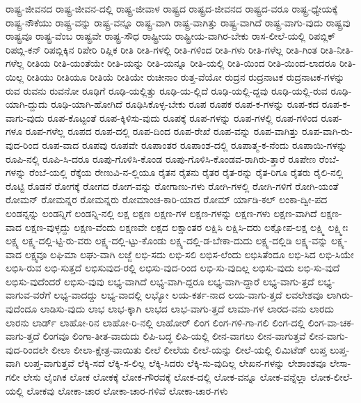 {ರಾಷ್ಟ್ರ-ಜೀವನದ
ರಾಷ್ಟ್ರ-ಜೀವನ-ದಲ್ಲಿ
ರಾಷ್ಟ್ರ-ಜೀವಾಳ
ರಾಷ್ಟ್ರದ
ರಾಷ್ಟ್ರದ-ಜೀವನದ
ರಾಷ್ಟ್ರದ-ವರೂ
ರಾಷ್ಟ್ರ-ಧ್ಯೇಯಕ್ಕೆ
ರಾಷ್ಟ್ರ-ನೌಕೆಯು
ರಾಷ್ಟ್ರ-ವನ್ನು
ರಾಷ್ಟ್ರ-ವನ್ನೂ
ರಾಷ್ಟ್ರ-ವಾಗಿ
ರಾಷ್ಟ್ರ-ವಾಗಿತ್ತು
ರಾಷ್ಟ್ರ-ವಾಗಿದೆ
ರಾಷ್ಟ್ರ-ವಾಗು-ವುದು
ರಾಷ್ಟ್ರವು
ರಾಷ್ಟ್ರವೂ
ರಾಷ್ಟ್ರ-ವೆಂಬ
ರಾಷ್ಟ್ರವೇ
ರಾಷ್ಟ್ರ-ಸೌಧ
ರಾಷ್ಟ್ರೀಯ
ರಾಷ್ಟ್ರೀಯ-ವಾಗಿರ-ಬೇಕು
ರಾಸ-ಲೀಲೆ-ಯಲ್ಲಿ
ರಿಪಬ್ಲಿಕ್
ರಿಪಬ್ಲಿ-ಕನ್
ರಿಪಬ್ಲಿಕ್ಕಿನ
ರಿಪೇರಿ
ರಿಪ್ಲಿಕ
ರೀತಿ
ರೀತಿ-ಗಳಲ್ಲಿ
ರೀತಿ-ಗಳಿಂದ
ರೀತಿ-ಗಳು
ರೀತಿ-ಗಳೆಲ್ಲ
ರೀತಿ-ಗಿಂತ
ರೀತಿ-ನೀತಿ-ಗಳೆಲ್ಲ
ರೀತಿಯ
ರೀತಿ-ಯಂತೆಯೇ
ರೀತಿ-ಯನ್ನು
ರೀತಿ-ಯನ್ನೂ
ರೀತಿ-ಯಲ್ಲಿ
ರೀತಿ-ಯಿಂದ
ರೀತಿ-ಯಿಂದ-ಲಾದರೂ
ರೀತಿ-ಯಿಲ್ಲ
ರೀತಿಯು
ರೀತಿಯೂ
ರೀತಿಯೆ
ರೀತಿಯೇ
ರುಚೀನಾಂ
ರುತ್ತ-ವೆಯೋ
ರುದ್ರನ
ರುದ್ರನಾಟಕ
ರುದ್ರನಾಟಕ-ಗಳನ್ನು
ರುವ
ರುವನು
ರುವನೋ
ರೂಢಿಗೆ
ರೂಢಿ-ಯಲ್ಲಿತ್ತು
ರೂಢಿ-ಯ-ಲ್ಲಿದೆ
ರೂಢಿ-ಯಲ್ಲಿ-ದ್ದವು
ರೂಢಿ-ಯಲ್ಲಿ-ರುವ
ರೂಢಿ-ಯಾಗಿ-ದ್ದುದು
ರೂಢಿ-ಯಾಗಿ-ಹೋಗಿದೆ
ರೂಢಿಸಿಕೊಳ್ಳ-ಬೇಕು
ರೂಪ
ರೂಪಕ
ರೂಪ-ಕ-ಗಳನ್ನು
ರೂಪ-ಕದ
ರೂಪ-ಕ-ವಾಗು-ವುದು
ರೂಪ-ಕೊಟ್ಟಂತೆ
ರೂಪ-ಕ್ಕಿಳಿಸು-ವುದು
ರೂಪಕ್ಕೆ
ರೂಪ-ಗಳನ್ನು
ರೂಪ-ಗಳಲ್ಲಿ
ರೂಪ-ಗಳಿಂದ
ರೂಪ-ಗಳೂ
ರೂಪ-ಗಳೆಲ್ಲ
ರೂಪದ
ರೂಪ-ದಲ್ಲಿ
ರೂಪ-ದಿಂದ
ರೂಪ-ರೇಖೆ
ರೂಪ-ವನ್ನು
ರೂಪ-ವಾಗಿತ್ತು
ರೂಪ-ವಾಗಿ-ರು-ವುದ-ರಿಂದ
ರೂಪ-ವಾದ
ರೂಪವು
ರೂಪವೇ
ರೂಪಾಂತರ
ರೂಪಾಂಶ-ದಲ್ಲಿ
ರೂಪಾತ್ಮ-ಕ-ನೆಂದು
ರೂಪಾಯಿ-ಗಳನ್ನು
ರೂಪಿ-ನಲ್ಲಿ
ರೂಪಿ-ಸಿ-ದರೂ
ರೂಪು-ಗೊಳಿಸಿ-ಕೊಂಡ
ರೂಪು-ಗೊಳಿಸಿ-ಕೊಂಡವ-ರಾಗಿರು-ತ್ತಾರೆ
ರೂಪೇಣ
ರೆಂಬೆ-ಗಳನ್ನು
ರೆಂಬೆ-ಯಲ್ಲಿ
ರೆಕ್ಕೆಯ
ರೇಣುವಿ-ನ-ಲ್ಲಿಯೂ
ರೈತನ
ರೈತನು
ರೈತರ
ರೈತ-ರನ್ನು
ರೈತ-ರಿಗೂ
ರೈತರು
ರೈಲಿ-ನಲ್ಲಿ
ರೊಟ್ಟಿ
ರೊಡನೆ
ರೋಗಕ್ಕೆ
ರೋಗದ
ರೋಗ-ವನ್ನು
ರೋಗಾಣು-ಗಳು
ರೋಗಿ-ಗಳಲ್ಲಿ
ರೋಗಿ-ಗಳಿಗೆ
ರೋಗಿ-ಯಂತೆ
ರೋಮನ್
ರೋಮನ್ನರ
ರೋಮನ್ನರು
ರೋಮಾಂಚ-ಕಾರಿ-ಯಾದ
ರೋಮ್
ರ್ಯಾಡಿ-ಕಲ್
ಲಂಕಾ-ದ್ವೀ-ಪದ
ಲಂಡನ್ನನ್ನು
ಲಂಡನ್ನಿಗೆ
ಲಂಡನ್ನಿ-ನಲ್ಲಿ
ಲಕ್ಷ
ಲಕ್ಷಣ
ಲಕ್ಷಣ-ಗಳ
ಲಕ್ಷಣ-ಗಳನ್ನು
ಲಕ್ಷಣ-ಗಳು
ಲಕ್ಷಣ-ವಾಗಿದೆ
ಲಕ್ಷಣ-ವಾದ
ಲಕ್ಷಣ-ವುಳ್ಳದ್ದು
ಲಕ್ಷಣ-ವೆಂದು
ಲಕ್ಷಣವೇ
ಲಕ್ಷದ
ಲಕ್ಷಾಂತರ
ಲಕ್ಷಿಸಿ
ಲಕ್ಷಿಸಿ-ದರು
ಲಕ್ಷೋಪ-ಲಕ್ಷ
ಲಕ್ಷ್ಮಿ
ಲಕ್ಷ್ಮೀಃ
ಲಕ್ಷ್ಯ
ಲಕ್ಷ್ಯ-ದಲ್ಲಿ-ಟ್ಟಿ-ರು-ವರು
ಲಕ್ಷ್ಯ-ದಲ್ಲಿ-ಟ್ಟು-ಕೊಂಡು
ಲಕ್ಷ್ಯ-ದಲ್ಲಿ-ಡ-ಬೇಕಾ-ದುದು
ಲಕ್ಷ್ಯ-ದಲ್ಲಿಡಿ
ಲಕ್ಷ್ಯ-ವನ್ನು
ಲಕ್ಷ್ಯ-ವಾದ
ಲಕ್ಷ್ಯವೂ
ಲಘಿಮಾ
ಲಘು-ವಾಗಿ
ಲಜ್ಜೆ
ಲಭಿ-ಸದು
ಲಭಿ-ಸಲಿ
ಲಭಿಸ-ಲೆಂದು
ಲಭಿಸಿತೆಂದೂ
ಲಭಿ-ಸಿದ
ಲಭಿ-ಸಿಯೇ
ಲಭಿಸಿ-ರುವ
ಲಭಿ-ಸುತ್ತದೆ
ಲಭಿಸುವುದ-ರಲ್ಲಿ
ಲಭಿಸು-ವುದ-ರಿಂದ
ಲಭಿ-ಸು-ವುದಿಲ್ಲ
ಲಭಿಸು-ವುದು
ಲಭಿ-ಸು-ವುದೆ
ಲಭಿಸು-ವುದೆಂದರೆ
ಲಭಿಸು-ವುವು
ಲಭ್ಯ-ವಾಗಿದೆ
ಲಭ್ಯ-ವಾಗಿ-ದ್ದರೂ
ಲಭ್ಯ-ವಾಗಿ-ದ್ದಾರೆ
ಲಭ್ಯ-ವಾಗು-ತ್ತದೆ
ಲಭ್ಯ-ವಾಗುವ-ವರೆಗೆ
ಲಭ್ಯ-ವಾದದ್ದು
ಲಭ್ಯ-ವಾದಲ್ಲಿ
ಲಭ್ಯೋ
ಲಯ-ಕರ್ತ-ನಾದ
ಲಯ-ವಾಗು-ತ್ತದೆ
ಲವಲೇಶವೂ
ಲಾಗಿರು-ವುದೆಂದೂ
ಲಾಡಿಸು-ವುದು
ಲಾಭ
ಲಾಭ-ಕ್ಕಾಗಿ
ಲಾಭದ
ಲಾಭ-ವಾಗು-ತ್ತದೆ
ಲಾಮಾ-ಗಳ
ಲಾರದ-ವನು
ಲಾರದು
ಲಾರನು
ಲಾರ್ಡ್
ಲಾಹೋ-ರಿನ
ಲಾಹೋ-ರಿ-ನಲ್ಲಿ
ಲಾಹೋರ್
ಲಿಂಗ
ಲಿಂಗ-ಗಳಿ-ಗಾ-ಗಲಿ
ಲಿಂಗ-ದಲ್ಲಿ
ಲಿಂಗ-ವಾ-ಚಕ-ವಾಗು-ತ್ತದೆ
ಲಿಂಗವೂ
ಲಿಂಗಾ-ತೀತ-ವಾದುದು
ಲಿಪಿ-ಬದ್ಧ
ಲಿಪಿ-ಯಲ್ಲಿ
ಲೀನ-ವಾಗಲು
ಲೀನ-ವಾಗುತ್ತವೆ
ಲೀನ-ವಾಗು-ವುದ-ರಿಂದಲೇ
ಲೀಲಾ
ಲೀಲಾ-ಕ್ಷೇತ್ರ-ವಾಯಿತು
ಲೀಲೆ
ಲೀಲೆಯ
ಲೀಲೆ-ಯನ್ನು
ಲೀಲೆ-ಯಲ್ಲಿ
ಲಿಮಿಟೆಡ್
ಲುಪ್ತ
ಲುಪ್ತ-ವಾಗಿ
ಲುಪ್ತ-ವಾಗುತ್ತವೆ
ಲೆಕ್ಕಿ-ಸದೆ
ಲೆಕ್ಕಿ-ಸ-ಲಿಲ್ಲ
ಲೆಕ್ಕಿ-ಸಿದರು
ಲೆಕ್ಕಿ-ಸು-ವುದಿಲ್ಲ
ಲೇಖನ-ಗಳನ್ನು
ಲೇಶಾಂಶವೂ
ಲೇಸಾ-ಗಲೀ
ಲೇಸು
ಲೈಂಗಿಕ
ಲೋಕ
ಲೋಕಕ್ಕೆ
ಲೋಕ-ಗೌರವಕ್ಕೆ
ಲೋಕ-ದಲ್ಲಿ
ಲೋಕ-ವನ್ನೂ
ಲೋಕ-ವನ್ನೆಲ್ಲಾ
ಲೋಕ-ಲೀಲೆ-ಯಲ್ಲಿ
ಲೋಕವು
ಲೋಕಾ-ಚಾರ
ಲೋಕಾ-ಚಾರ-ಗಳಿವೆ
ಲೋಕಾ-ಚಾರ-ಗಳು
}
